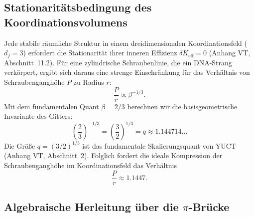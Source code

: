 \documentclass[12pt,a4paper]{article}
\newcommand{\Keff}{K_{\mathrm{eff}}}
\newcommand{\df}{d_{\!f}}
\begin{document}
	\subsection{Stationaritätsbedingung des Koordinationsvolumens}
	
	Jede stabile räumliche Struktur in einem dreidimensionalen Koordinationsfeld ($\df=3$) erfordert die Stationarität ihrer inneren Effizienz $\delta\Keff = 0$ (Anhang VT, Abschnitt~11.2). Für eine zylindrische Schraubenlinie, die ein DNA-Strang verkörpert, ergibt sich daraus eine strenge Einschränkung für das Verhältnis von Schraubenganghöhe $P$ zu Radius $r$:
	\begin{equation}
		\frac{P}{r} \propto \beta^{-1/3}.
		\label{eq:dna-pr}
	\end{equation}
	Mit dem fundamentalen Quant $\beta = 2/3$ berechnen wir die basisgeometrische Invariante des Gitters:
	\begin{equation}
		\left(\frac{2}{3}\right)^{-1/3} = \left(\frac{3}{2}\right)^{1/3} = q \approx 1.144714\ldots
		\label{eq:q-def}
	\end{equation}
	Die Größe $q = (3/2)^{1/3}$ ist das fundamentale Skalierungsquant von YUCT (Anhang VT, Abschnitt~2). Folglich fordert die ideale Kompression der Schraubenganghöhe im Koordinationsfeld das Verhältnis
	\begin{equation}
		\frac{P}{r} \approx 1.1447.
		\label{eq:pr-ideal}
	\end{equation}
	
	\subsection{Algebraische Herleitung über die $\pi$-Brücke}
	
\end{document}
